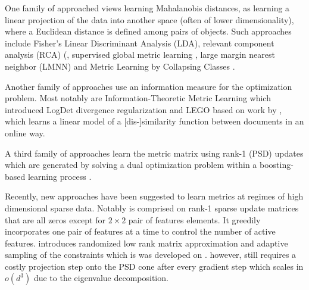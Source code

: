 \documentclass{article}
\begin{document}
One family of approached views learning Mahalanobis distances, as learning a linear projection of the data into another space (often of lower dimensionality), where a Euclidean distance is
defined among pairs of objects. Such approaches include Fisher’s Linear Discriminant Analysis
(LDA), relevant component analysis (RCA) (, supervised global
metric learning , large margin nearest neighbor (LMNN)  and Metric Learning by Collapsing Classes .

Another family of approaches use an information measure for the optimization problem. Most notably are Information-Theoretic Metric Learning  which introduced LogDet divergence regularization and LEGO \cite{lego} based on work by , which learns a linear model of a [dis-]similarity function between documents in an online way.

A third family of approaches \cite{boost}  learn the metric matrix using rank-1 (PSD) updates which are generated by solving a dual optimization problem within a boosting-based learning process .


Recently, new approaches have been suggested to learn metrics at regimes of high dimensional sparse data. Notably \cite{hdsl} is comprised on rank-1 sparse update matrices that are all zeros except for $2\times2$ pair of features elements. It greedily incorporates one pair of features at a time to control the number of active features. \cite{qian2014} introduces randomized low rank matrix approximation and adaptive sampling of the constraints which is was developed on \cite{qian}. \cite{qian} however, still requires a costly projection step onto the PSD cone after every gradient step which scales in $o(d^3)$ due to the eigenvalue decomposition.

\end{document}
